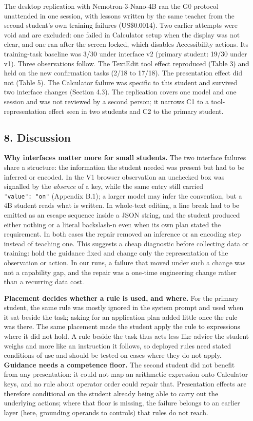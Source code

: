 \documentclass[
  10pt,
]{article}
\begin{document}
The desktop replication with Nemotron-3-Nano-4B ran the G0 protocol
unattended in one session, with lessons written by the same teacher from
the second student's own training failures (US\$0.0014). Two earlier
attempts were void and are excluded: one failed in Calculator setup when
the display was not clear, and one ran after the screen locked, which
disables Accessibility actions. Its training-task baseline was 3/30
under interface v2 (primary student: 19/30 under v1). Three observations
follow. The TextEdit tool effect reproduced (Table 3) and held on the
new confirmation tasks (2/18 to 17/18). The presentation effect did not
(Table 5). The Calculator failure was specific to this student and
survived two interface changes (Section 4.3). The replication covers one
model and one session and was not reviewed by a second person; it
narrows C1 to a tool-representation effect seen in two students and C2
to the primary student.

\subsection{8. Discussion}\label{discussion}

\textbf{Why interfaces matter more for small students.} The two
interface failures share a structure: the information the student needed
was present but had to be inferred or encoded. In the V1 browser
observation an unchecked box was signalled by the \emph{absence} of a
key, while the same entry still carried \texttt{"value":\ "on"}
(Appendix B.1); a larger model may infer the convention, but a 4B
student reads what is written. In whole-text editing, a line break had
to be emitted as an escape sequence inside a JSON string, and the
student produced either nothing or a literal backslash-n even when its
own plan stated the requirement. In both cases the repair removed an
inference or an encoding step instead of teaching one. This suggests a
cheap diagnostic before collecting data or training: hold the guidance
fixed and change only the representation of the observation or action.
In our runs, a failure that moved under such a change was not a
capability gap, and the repair was a one-time engineering change rather
than a recurring data cost.

\textbf{Placement decides whether a rule is used, and where.} For the
primary student, the same rule was mostly ignored in the system prompt
and used when it sat beside the task; asking for an application plan
added little once the rule was there. The same placement made the
student apply the rule to expressions where it did not hold. A rule
beside the task thus acts less like advice the student weighs and more
like an instruction it follows, so deployed rules need stated conditions
of use and should be tested on cases where they do not apply.
\textbf{Guidance needs a competence floor.} The second student did not
benefit from any presentation: it could not map an arithmetic expression
onto Calculator keys, and no rule about operator order could repair
that. Presentation effects are therefore conditional on the student
already being able to carry out the underlying actions; where that floor
is missing, the failure belongs to an earlier layer (here, grounding
operands to controls) that rules do not reach.
\end{document}
